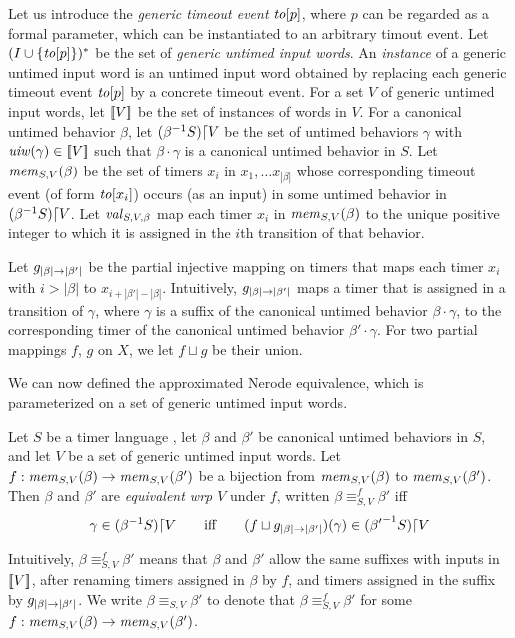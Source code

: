 Let us introduce the {\em generic timeout event} $\toevent{p}$, where $p$ can
be regarded as a formal parameter,
which can be instantiated to an arbitrary timout event.
Let $(I \cup \set{\toevent{p}})^*$ be the set of
{\em generic untimed input words}.
An {\em instance} of a generic untimed input word is an untimed input
word obtained by replacing each generic timeout event
$\toevent{p}$ by a concrete timeout event.
For a set $V$ of generic untimed input words, let $\instancesof{V}$ be the
set of instances of words in $V$. For a canonical untimed
behavior $\beta$, let $\apprsuffixbehs{S}{\beta}{V}$ be the set of untimed behaviors
$\gamma$ with $\untimedinputword(\gamma) \in \instancesof{V}$ such that
$\beta\cdot\gamma$ is a canonical untimed behavior in $S$. Let
$\apprgetmemorable{S}{\beta}{V}$ be the set of timers $x_i$ in
$x_1 , \ldots x_{|\beta|}$ whose corresponding timeout event
(of form $\toevent{x_i}$) occurs (as an input) in some untimed behavior in
$\apprsuffixbehs{S}{\beta}{V}$.
Let $\apprgetassignment{S}{\beta}{V}$ map each timer $x_i$ in
$\apprgetmemorable{S}{\beta}{V}$ to the unique positive integer to which it
is assigned in the $i$th transition of that behavior.


Let $\suffbij{\beta}{\beta'}$ be the partial injective mapping
on timers that maps each
timer $x_i$ with $i > |\beta|$ to $x_{i + |\beta'| - |\beta|}$.
Intuitively, $\suffbij{\beta}{\beta'}$ maps a timer that is assigned 
in a transition of $\gamma$, where $\gamma$ is a suffix of the canonical
untimed behavior $\beta \cdot \gamma$, to the corresponding timer of
the canonical untimed behavior $\beta'\cdot\gamma$.
For two partial mappings $f$, $g$ on $X$, we let $f \sqcup g$ be their
union. 


We can now defined the approximated Nerode equivalence, which is parameterized
on a set of generic untimed input words.

\begin{definition}
  \label{def:approx-nerode}
Let $S$ be a timer language ,
let $\beta$ and $\beta'$ be canonical untimed behaviors in $S$,
and let  $V$ be a set of
generic untimed input words.
Let $f : \apprgetmemorable{S}{\beta}{V} \to \apprgetmemorable{S}{\beta'}{V}$
be a bijection
from $\apprgetmemorable{S}{\beta}{V}$ to $\apprgetmemorable{S}{\beta'}{V}$.
Then $\beta$ and $\beta'$ are \emph{equivalent wrp $V$} under $f$, written
$\beta \equiv_{S,V}^f \beta'$ iff
\[
\gamma \in \apprsuffixbehs{S}{\beta}{V}
\qquad \mbox{iff} \qquad
(f \sqcup \suffbij{\beta}{\beta'}) (\gamma) \in \apprsuffixbehs{S}{\beta'}{V}
\]
\end{definition}
Intuitively, $\beta \equiv_{S,V}^f \beta'$ means that $\beta$ and $\beta'$
allow the same suffixes with inputs in $\instancesof{V}$, after renaming
timers assigned in $\beta$ by $f$, and timers assigned in the suffix by
$\suffbij{\beta}{\beta'}$.
We write $\beta \equiv_{S,V} \beta'$ to denote that
$\beta \equiv_{S,V}^f \beta'$ for some
$f : \apprgetmemorable{S}{\beta}{V} \to \apprgetmemorable{S}{\beta'}{V}$.



